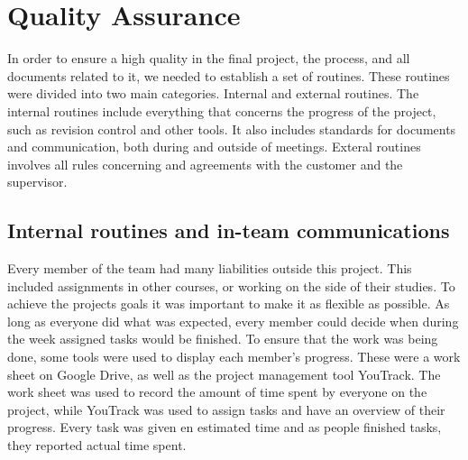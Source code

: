 
\section{Quality Assurance}
\label{sec:PlanningQuality}
In order to ensure a high quality in the final project, the process, and all documents related to it, we needed to establish a set of routines. These routines were divided into two main categories. Internal and external routines. The internal routines include everything that concerns the progress of the project, such as revision control and other tools. It also includes standards for documents and communication, both during and outside of meetings. Exteral routines involves all rules concerning and agreements with the customer and the supervisor.

\subsection{Internal routines and in-team communications}
\label{subsec:PlanningQualityRoutines}
Every member of the team had many liabilities outside this project. This included assignments in other courses, or working on the side of their studies. To achieve the projects goals it was important to make it as flexible as possible. As long as everyone did what was expected, every member could decide when during the week assigned tasks would be finished. To ensure that the work was being done, some tools were used to display each member's progress. These were a work sheet on Google Drive, as well as the project management tool YouTrack. The work sheet was used to record the amount of time spent by everyone on the project, while YouTrack was used to assign tasks and have an overview of their progress. Every task was given en estimated time and as people finished tasks, they reported actual time spent.

